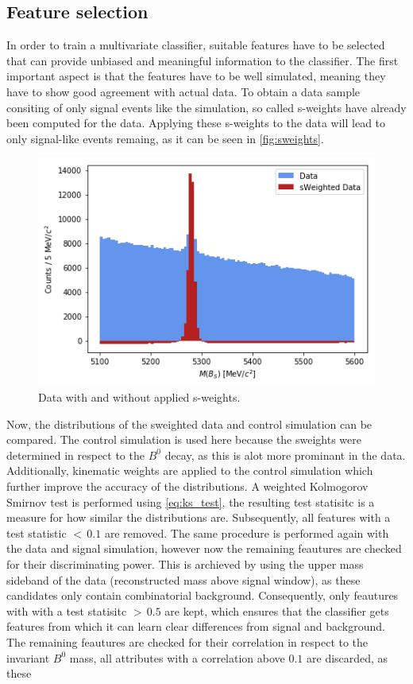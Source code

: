 \subsection{Feature selection}
In order to train a multivariate classifier, suitable features have to be selected that can provide unbiased and meaningful information to the classifier.
The first important aspect is that the features have to be well simulated, meaning they have to show good agreement with actual data. To obtain a data sample consiting of only signal
events like the simulation, so called s-weights have already been computed for the data. Applying these s-weights to the data will lead to only signal-like events remaing, as 
it can be seen in \autoref{fig:sweights}.
\begin{figure}[H]
	\centering
	\includegraphics[width=0.5\linewidth]{plots/sweights.png}
	\caption{Data with and without applied s-weights.}
	\label{fig:sweights}
\end{figure}
Now, the distributions of the sweighted data and control simulation can be compared. The control simulation is used here because the sweights were determined in respect to the
$B^0$ decay, as this is alot more prominant in the data. Additionally, kinematic weights are applied to the control simulation which further improve the accuracy of the distributions.
A weighted Kolmogorov Smirnov test is performed using \eqref{eq:ks_test}, the resulting test statisitc is a measure for how similar the distributions are. 
Subsequently, all features with a test statistic $< \, 0.1$ are removed. 
The same procedure is performed again with the data and signal simulation, however now the remaining feautures are checked for their discriminating power.
This is archieved by using the upper mass sideband of the data (reconstructed mass above signal window), as these candidates only contain combinatorial background. Consequently,
only feautures with with a test statisitc $> \, 0.5$ are kept, which ensures that the classifier gets features from which it can learn clear differences from signal and background.
The remaining feautures are checked for their correlation in respect to the invariant $B^0$ mass, all attributes with a correlation above $0.1$ are discarded, as these
